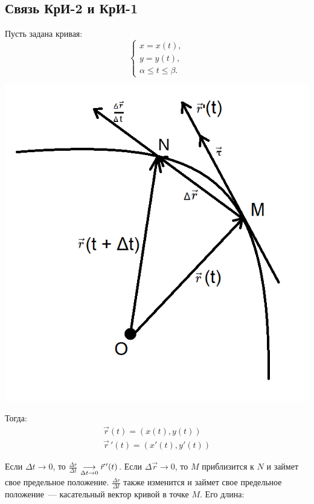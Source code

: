 \documentclass[../../main.tex]{subfiles}
\begin{document}
	\subsection{Связь КрИ-2 и КрИ-1}
	
	Пусть задана кривая:
	\[
	\begin{cases}
	x = x(t),\\
	y = y(t),\\
	\alpha \leq t \leq \beta.
	\end{cases}
	\]
	
	\begin{center}
		\includegraphics[scale = 0.8]{lec20_1.png}
	\end{center}
	
	Тогда:
	\begin{gather*}
	\vec r(t) = \left( x(t), y(t) \right) \\
	\vec r\,'(t) = \left( x'(t), y'(t) \right)
	\end{gather*}
	
	Если $\Delta t \to 0$, то $\frac{\Delta r}{\Delta t}$
	$ \underset{\Delta t \to 0}\longrightarrow
	\vec{r}\,'(t)$.
	Если $\Delta \vec{r} \to 0$, то $M$ приблизится к $N$
	и займет свое предельное положение.
	$\frac{\Delta r}{\Delta t}$ также изменится и займет 
	свое предельное положение~--- касательный вектор кривой в точке $M$. Его 
	длина:
	
\end{document}
